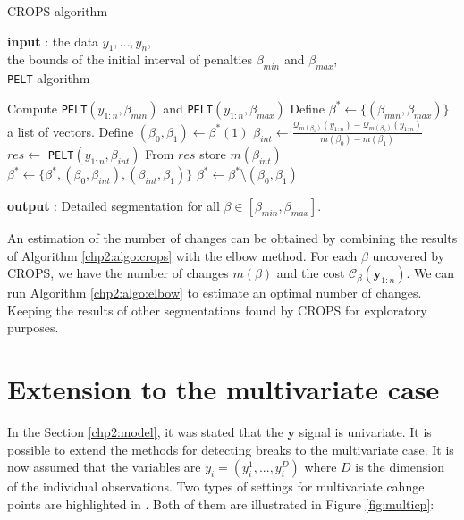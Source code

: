 \begin{algorithm}[ht]
\caption{CROPS algorithm}\label{chp2:algo:crops}
\begin{algorithmic}

\State \textbf{input} : the data $y_{1},...,y_{n}$, \\
the bounds of the initial interval of penalties $\beta_{min}$ and $\beta_{max}$, \\
\texttt{PELT} algorithm 
  
\State Compute \texttt{PELT}$(y_{1:n},\beta_{min})$ and \texttt{PELT}$(y_{1:n},\beta_{max})$ 
\State Define $\beta^* \gets \{(\beta_{min},\beta_{max})\}$ a list of vectors.  
\While{$\beta^*\neq \emptyset$}
  \State Define $(\beta_0, \beta_1) \gets \beta^*(1)$
    \State $\beta_{int} \gets \frac{\mathcal{Q}_{m(\beta_1)}(y_{1:n})-\mathcal{Q}_{m(\beta_0)}(y_{1:n})}{m(\beta_0)-m(\beta_1)}$
    \State $res \gets$ \texttt{PELT}$(y_{1:n},\beta_{int})$
    \State From $res$ store $m(\beta_{int})$
      \State $\beta^* \gets \{\beta^*,(\beta_0,\beta_{int}),(\beta_{int},\beta_1)\}$
    \EndIf
  \EndIf
  \State $\beta^* \gets \beta^*$\textbackslash$(\beta_0,\beta_1)$
\EndWhile 
   
\State \textbf{output} : Detailed segmentation for all $\beta \in [\beta_{min},\beta_{max}]$. 
\end{algorithmic}
\end{algorithm} 

An estimation of the number of changes can be obtained by combining the results of Algorithm  \ref{chp2:algo:crops} with the elbow method. For each $\beta$ uncovered by CROPS, we have the number of changes $m(\beta)$ and the cost $\mathcal{C}_{\beta}(\bm y_{1:n})$. We can run Algorithm \ref{chp2:algo:elbow} to estimate an optimal number of changes. Keeping the results of other segmentations found by CROPS for exploratory purposes. 

\section{Extension to the multivariate case}

In the Section \ref{chp2:model}, it was stated that the $\bm y$ signal is univariate. It is possible to extend the methods for detecting breaks to the multivariate case. It is now assumed that the variables are $y_i = (y_i^1,...,y_i^D)$ where $D$ is the dimension of the individual observations. Two types of settings for multivariate cahnge points are highlighted in \cite{pickering2016changepoint}. Both of them are illustrated in Figure \ref{fig:multicp}:

